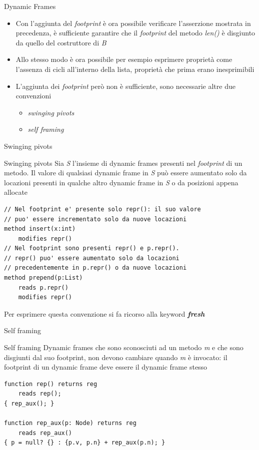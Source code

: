 \documentclass[]{beamer}
\begin{document}
\begin{frame}{Dynamic Frames}
    \begin{itemize}
        \item Con l'aggiunta del \textit{footprint} è ora possibile verificare l'asserzione mostrata in precedenza, è sufficiente garantire che il \textit{footprint} del metodo \textit{len()} è disgiunto da quello del costruttore di \textit{B}
        \item Allo stesso modo è ora possibile per esempio esprimere proprietà come l'assenza di cicli all'interno della lista, proprietà che prima erano inesprimibili
        \item L'aggiunta dei \textit{footprint} però non è sufficiente, sono necessarie altre due convenzioni \begin{itemize}
            \item \textit{swinging pivots}
            \item \textit{self framing}
        \end{itemize}
    \end{itemize}
\end{frame}

\begin{frame}[containsverbatim]{Swinging pivots}
\begin{block}{Swinging pivots}
    Sia \textit{S} l'insieme di dynamic frames presenti nel \textit{footprint} di un metodo. Il valore di qualsiasi dynamic frame in \textit{S} può essere aumentato solo da locazioni presenti in qualche altro dynamic frame in \textit{S} o da posizioni appena allocate
\end{block}
\lstset{linewidth=11cm}
\begin{lstlisting}
// Nel footprint e' presente solo repr(): il suo valore 
// puo' essere incrementato solo da nuove locazioni
method insert(x:int)
    modifies repr()
// Nel footprint sono presenti repr() e p.repr(). 
// repr() puo' essere aumentato solo da locazioni 
// precedentemente in p.repr() o da nuove locazioni
method prepend(p:List)
    reads p.repr()
    modifies repr()
\end{lstlisting}
Per esprimere questa convenzione si fa ricorso alla keyword \textit{\textbf{fresh}}
\end{frame}

\begin{frame}[containsverbatim]{Self framing}
\begin{block}{Self framing}
    Dynamic frames che sono sconosciuti ad un metodo \textit{m} e che sono disgiunti dal suo footprint, non devono cambiare quando \textit{m} è invocato: il footprint di un dynamic frame deve essere il dynamic frame stesso
\end{block}    
\lstset{linewidth=11cm}
\begin{lstlisting}
function rep() returns reg
    reads rep();
{ rep_aux(); }

function rep_aux(p: Node) returns reg
    reads rep_aux()
{ p = null? {} : {p.v, p.n} + rep_aux(p.n); }
\end{lstlisting}
\end{frame}
\end{document}
